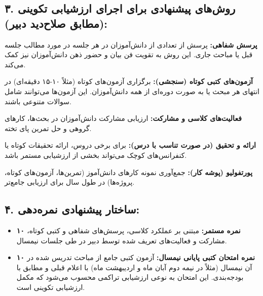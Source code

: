 \documentclass[a4paper,14pt]{article}
\begin{document}
\subsection*{۳. روش‌های پیشنهادی برای اجرای ارزشیابی تکوینی (مطابق صلاح‌دید دبیر):}
\textbf{پرسش شفاهی:} پرسش از تعدادی از دانش‌آموزان در هر جلسه در مورد مطالب جلسه قبل یا مباحث جاری. این روش به تقویت فن بیان و حضور ذهن دانش‌آموزان نیز کمک می‌کند.

\textbf{آزمون‌های کتبی کوتاه (سنجشی):} برگزاری آزمون‌های کوتاه (مثلاً ۱۰-۱۵ دقیقه‌ای) در انتهای هر مبحث یا به صورت دوره‌ای از همه دانش‌آموزان. این آزمون‌ها می‌توانند شامل سوالات متنوعی باشند.

\textbf{فعالیت‌های کلاسی و مشارکت:} ارزیابی مشارکت دانش‌آموزان در بحث‌ها، کارهای گروهی و حل تمرین پای تخته.

\textbf{ارائه و تحقیق (در صورت تناسب با درس):} برای برخی دروس، ارائه تحقیقات کوتاه یا کنفرانس‌های کوچک می‌تواند بخشی از ارزشیابی مستمر باشد.

\textbf{پورتفولیو (پوشه کار):} جمع‌آوری نمونه کارهای دانش‌آموز (تمرین‌ها، آزمون‌های کوتاه، پروژه‌ها) در طول سال برای ارزیابی جامع‌تر.
\medskip

\subsection*{۴. ساختار پیشنهادی نمره‌دهی:}
\begin{itemize}
    \item \textbf{۱۰ نمره مستمر:} مبتنی بر عملکرد کلاسی، پرسش‌های شفاهی و کتبی کوتاه، مشارکت و فعالیت‌های تعریف شده توسط دبیر در طی جلسات نیمسال.
    \item \textbf{۱۰ نمره امتحان کتبی پایانی نیمسال:} آزمون کتبی جامع از مباحث تدریس شده در آن نیمسال (مثلاً در نیمه دوم آبان ماه و اردیبهشت ماه) با اعلام قبلی و مطابق با بودجه‌بندی. این امتحان به نوعی ارزشیابی تراکمی محسوب می‌شود که مکمل ارزشیابی تکوینی است.
\end{itemize}
\medskip
\end{document}
